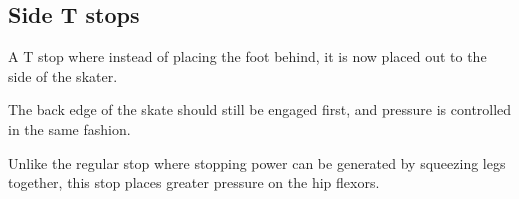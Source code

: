 \subsection*{Side T stops}
\label{drill:t_stop:side}


A T stop where instead of placing the foot behind, it is now placed out to the side of the skater.

The back edge of the skate should still be engaged first, and pressure is controlled in the same fashion.

Unlike the regular stop where stopping power can be generated by squeezing legs together, this stop places greater pressure on the hip flexors.
